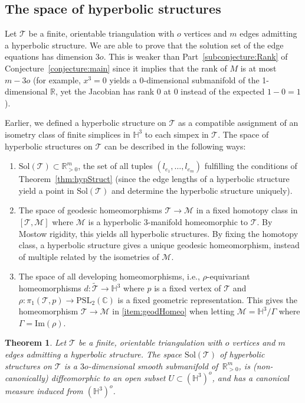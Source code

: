 \documentclass[utopia,fullpage]{nmd/article}
\newcommand{\negSpace}{\!}
\newcommand\C{\mathbb C}
\newcommand\R{\mathbb R}
\renewcommand\H{\mathbb H}
\newtheorem{theorem}{Theorem}[section]
\newcommand{\negSpace}{}
\newcommand\myPSL[2]{\mathrm{PSL}_{#1}(#2)}
\newcommand\trig{\mathcal{T}}
\newcommand\edgeEqSol{\mathrm{Sol}}
\begin{document}
\subsection{The space of hyperbolic structures}

Let $\trig$\negSpace{} be a finite, orientable triangulation with $o$ vertices and $m$ edges admitting a hyperbolic structure. We are able to prove that the solution set of the edge equations has dimension $3o$. This is weaker than Part~\eqref{subconjecture:Rank} of Conjecture~\ref{conjecture:main} since it implies that the rank of $M$ is at most $m-3o$ (for example, $x^3=0$ yields a $0$-dimensional submanifold of the 1-dimensional $\R$, yet the Jacobian has rank $0$ at $0$ instead of the expected $1-0=1$).

Earlier, we defined a hyperbolic structure on $\trig$ as a compatible assignment of an isometry class of finite simplices in $\H^3$ to each simpex in $\trig$\negSpace{}. The space of hyperbolic structures on $\trig\negSpace{}$ can be described in the following ways:
\begin{enumerate}
\item $\edgeEqSol(\trig)\subset\R_{>0}^m$, the set of all tuples $(l_{e_1},\dots,l_{e_m})$ fulfilling the conditions of Theorem~\ref{thm:hypStruct} (since the edge lengths of a hyperbolic structure yield a point in $\edgeEqSol(\trig)$ and determine the hyperbolic structure uniquely).
\item The space of geodesic homeomorphisms $\trig\to\mathcal{M}$
in a fixed homotopy class in $[\trig\negSpace{},\mathcal{M}]$ where $\mathcal{M}$ is a hyperbolic 3-manifold homeomorphic to $\trig\negSpace{}$.
By Mostow rigidity, this yields all hyperbolic structures. By fixing the homotopy class, a hyperbolic structure gives a unique geodesic homeomorphism, instead of multiple related by the isometries of $\mathcal{M}$. \label{item:geodHomeo}
\item The space of all developing homeomorphisms, i.e., $\rho$-equivariant homeomorphisms $d:\tilde{\trig}\to\H^3$ where $p$ is a fixed vertex of $\trig\negSpace{}$ and $\rho:\pi_1(\trig\negSpace{},p)\to\myPSL{2}{\C}$ is a fixed geometric representation. This gives the homeomorphism $\trig\negSpace{}\to\mathcal{M}$ in \eqref{item:geodHomeo} when letting $\mathcal{M}=\H^3/\Gamma$ where $\Gamma=\mathrm{Im}(\rho)$.
\end{enumerate}

\begin{theorem} \label{thm:hypStructAreSubmanifold}
Let $\trig$\negSpace{} be a finite, orientable triangulation with $o$ vertices and $m$ edges admitting a hyperbolic structure.
The space $\edgeEqSol(\trig)$ of hyperbolic structures on $\trig$ is a $3o$-dimensional smooth submanifold of \,$\R_{>0}^m$, is (non-canonically) diffeomorphic to an open subset $U\subset \left(\H^3\right)^o$, and has a canonical measure induced from $\left(\H^3\right)^o$.
\end{theorem}
\end{document}
